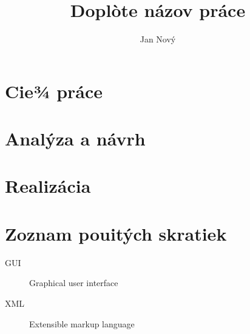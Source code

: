 \documentclass[thesis=M,slovak]{FITthesis}[2019/03/21]
\title{Doplòte názov práce}
\author{Jan Nový} %
\begin{document}

\begin{introduction}
\end{introduction}

\chapter{Cie¾ práce}

\chapter{Analýza a návrh}

\chapter{Realizácia}

\begin{conclusion}
\end{conclusion}




\appendix

\chapter{Zoznam pouitých skratiek}
\begin{description}
	\item[GUI] Graphical user interface
	\item[XML] Extensible markup language
\end{description}
\end{document}
